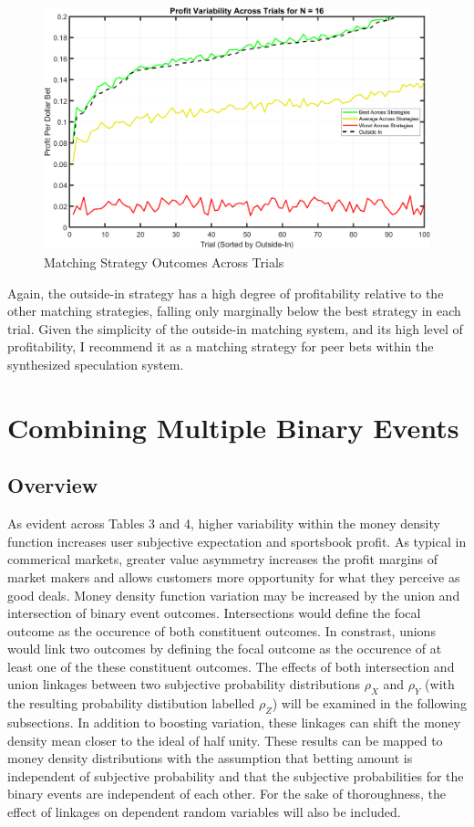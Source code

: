 \documentclass[sn-mathphys-num]{sn-jnl}
\theoremstyle{thmstyleone}%
\theoremstyle{thmstyletwo}%
\theoremstyle{thmstylethree}%
\begin{document}
\begin{figure}[H]
	\centering
	\includegraphics[width=13cm]{Matching Strategy Outcomes Across Trials}
	\caption{Matching Strategy Outcomes Across Trials}
\end{figure}

Again, the outside-in strategy has a high degree of profitability relative to the other matching strategies, falling only marginally below the best strategy in each trial. Given the simplicity of the outside-in matching system, and its high level of profitability, I recommend it as a matching strategy for peer bets within the synthesized speculation system.

\section{Combining Multiple Binary Events}

\subsection{Overview}

As evident across Tables 3 and 4, higher variability within the money density function increases user subjective expectation and sportsbook profit. As typical in commerical markets, greater value asymmetry increases the profit margins of market makers and allows customers more opportunity for what they perceive as good deals. Money density function variation may be increased by the union and intersection of binary event outcomes. Intersections would define the focal outcome as the occurence of both constituent outcomes. In constrast, unions would link two outcomes by defining the focal outcome as the occurence of at least one of the these constituent outcomes. The effects of both intersection and union linkages between two subjective probability distributions $\rho_X$ and $\rho_Y$ (with the resulting probability distibution labelled $\rho_Z$) will be examined in the following subsections. In addition to boosting variation, these linkages can shift the money density mean closer to the ideal of half unity. These results can be mapped to money density distributions with the assumption that betting amount is independent of subjective probability and that the subjective probabilities for the binary events are independent of each other. For the sake of thoroughness, the effect of linkages on dependent random variables will also be included. 
\end{document}

